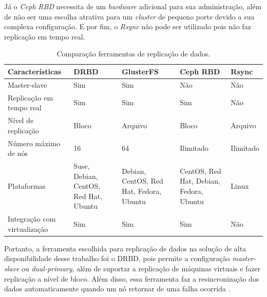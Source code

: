 Já o \textit{Ceph RBD} necessita de um \textit{hardware} adicional para sua administração, além de não ser uma escolha atrativa para um 
\textit{cluster} de pequeno porte devido a sua complexa configuração. 
E por fim, o \textit{Rsync} não pode ser utilizado pois não faz replicação em tempo real.

\begin{table}[h!]
\caption{Comparação ferramentas de replicação de dados.}
\label{tab:replicacao}
\begin{center}
\begin{tabular}{|l|p{2.7cm}|p{2.7cm}|p{2.7cm}|p{2cm}|}\hline
\textbf{Características} & \textbf{DRBD} & \textbf{GlusterFS} & \textbf{Ceph RBD} & \textbf{Rsync} \\\hline
Master-slave & Sim & Sim & Não & Não \\\hline
Replicação em tempo real & Sim & Sim & Sim & Não \\\hline
Nível de replicação & Bloco & Arquivo & Bloco & Arquivo \\\hline
Número máximo de nós & 16 & 64 & Ilimitado & Ilimitado \\\hline
Plataformas & Suse, Debian, CentOS, Red Hat, Ubuntu & Debian, CentOS, Red Hat, Fedora, Ubuntu & CentOS, Red Hat, Debian, Fedora, Ubuntu & Linux \\\hline
Integração com virtualização & Sim & Sim & Sim & Não \\\hline
\end{tabular}
\end{center}
\end{table}

Portanto, a ferramenta escolhida para replicação de dados na solução de alta disponibilidade desse trabalho foi o \ac{DRBD}, pois permite a 
configuração \textit{master-slave} ou \textit{dual-primary}, além de suportar a replicação de máquinas virtuais e fazer replicação a nível de bloco. Além disso, essa 
ferramenta faz a resincronização dos dados automaticamente quando um nó retornar de uma falha ocorrida \cite{drbd}.




